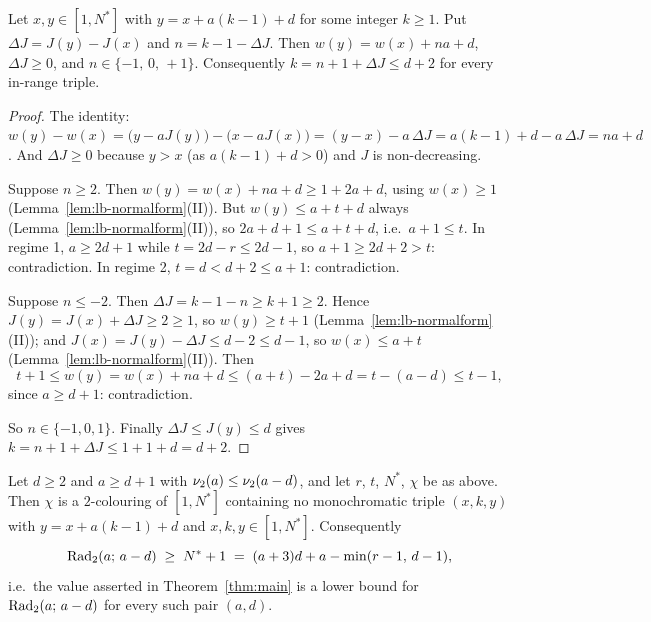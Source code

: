 \begin{lemma}\label{lem:lb-trichotomy}
Let $x, y \in [1, N^{*}]$ with $y = x + a(k-1) + d$ for some integer $k \ge 1$.
Put $\Delta J = J(y) - J(x)$ and $n = k - 1 - \Delta J$. Then
$w(y) = w(x) + na + d$, $\Delta J \ge 0$, and $n \in \{-1,\, 0,\, +1\}$.
Consequently $k = n + 1 + \Delta J \le d + 2$ for every in-range triple.
\end{lemma}

\begin{proof}
The identity:
$w(y) - w(x) = \bigl(y - a J(y)\bigr) - \bigl(x - a J(x)\bigr)
= (y - x) - a\,\Delta J = a(k-1) + d - a\,\Delta J = na + d$. And $\Delta J \ge 0$
because $y > x$ (as $a(k-1) + d > 0$) and $J$ is non-decreasing.

Suppose $n \ge 2$. Then $w(y) = w(x) + na + d \ge 1 + 2a + d$, using
$w(x) \ge 1$ (Lemma~\ref{lem:lb-normalform}(II)). But $w(y) \le a + t + d$ always
(Lemma~\ref{lem:lb-normalform}(II)), so $2a + d + 1 \le a + t + d$, i.e.\
$a + 1 \le t$. In regime 1, $a \ge 2d+1$ while $t = 2d - r \le 2d - 1$, so
$a + 1 \ge 2d + 2 > t$: contradiction. In regime 2, $t = d < d + 2 \le a + 1$:
contradiction.

Suppose $n \le -2$. Then $\Delta J = k - 1 - n \ge k + 1 \ge 2$. Hence
$J(y) = J(x) + \Delta J \ge 2 \ge 1$, so $w(y) \ge t + 1$
(Lemma~\ref{lem:lb-normalform}(II)); and $J(x) = J(y) - \Delta J \le d - 2 \le d - 1$,
so $w(x) \le a + t$ (Lemma~\ref{lem:lb-normalform}(II)). Then
\[
  t + 1 \le w(y) = w(x) + na + d \le (a + t) - 2a + d = t - (a - d) \le t - 1,
\]
since $a \ge d + 1$: contradiction.

So $n \in \{-1, 0, 1\}$. Finally $\Delta J \le J(y) \le d$ gives
$k = n + 1 + \Delta J \le 1 + 1 + d = d + 2$.
\end{proof}

\begin{theorem}\label{thm:lb}
Let $d \ge 2$ and $a \ge d+1$ with $\nu_2(a) \le \nu_2(a-d)$, and let $r$, $t$,
$N^{*}$, $\chi$ be as above. Then $\chi$ is a $2$-colouring of $[1, N^{*}]$
containing no monochromatic triple $(x, k, y)$ with $y = x + a(k-1) + d$ and
$x, k, y \in [1, N^{*}]$. Consequently
\[
  \mathrm{Rad}_2(a;\, a-d) \;\ge\; N^{*} + 1 \;=\; (a+3)d + a - \min(r-1,\, d-1),
\]
i.e.\ the value asserted in Theorem~\ref{thm:main} is a lower bound for
$\mathrm{Rad}_2(a;\, a-d)$ for every such pair $(a, d)$.
\end{theorem}

